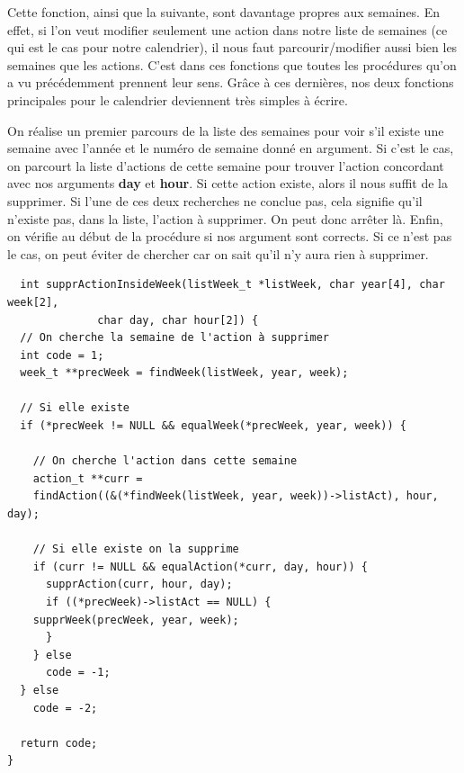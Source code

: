 \documentclass[11pt]{article}
\begin{document}
\begin{enumerate}
Cette fonction, ainsi que la suivante, sont davantage propres aux semaines. En
effet, si l'on veut modifier seulement une action dans notre liste de semaines
(ce qui est le cas pour notre calendrier), il nous faut parcourir/modifier
aussi bien les semaines que les actions.
C'est dans ces fonctions que toutes les procédures qu'on a vu précédemment prennent leur sens. Grâce à ces dernières, nos deux fonctions principales pour le
calendrier deviennent très simples à écrire.

On réalise un premier parcours de la liste des semaines pour voir s'il
existe une semaine avec l'année et le numéro de semaine donné en
argument. Si c'est le cas, on parcourt la liste d'actions de cette semaine
pour trouver l'action concordant avec nos arguments \textbf{day} et \textbf{hour}. Si
cette action existe, alors il nous suffit de la supprimer. Si l'une de ces
deux recherches ne conclue pas, cela signifie qu'il n'existe pas, dans la liste, l'action à supprimer. On peut donc arrêter là. Enfin, on vérifie au
début de la procédure si nos argument sont corrects. Si ce n'est pas le cas,
on peut éviter de chercher car on sait qu'il n'y aura rien à supprimer.

\begin{lstlisting}
  int supprActionInsideWeek(listWeek_t *listWeek, char year[4], char week[2],
			  char day, char hour[2]) {
  // On cherche la semaine de l'action à supprimer
  int code = 1;
  week_t **precWeek = findWeek(listWeek, year, week);

  // Si elle existe
  if (*precWeek != NULL && equalWeek(*precWeek, year, week)) {

    // On cherche l'action dans cette semaine
    action_t **curr =
	findAction((&(*findWeek(listWeek, year, week))->listAct), hour, day);

    // Si elle existe on la supprime
    if (curr != NULL && equalAction(*curr, day, hour)) {
      supprAction(curr, hour, day);
      if ((*precWeek)->listAct == NULL) {
	supprWeek(precWeek, year, week);
      }
    } else
      code = -1;
  } else
    code = -2;

  return code;
}
\end{lstlisting}



\end{enumerate}
\end{document}
